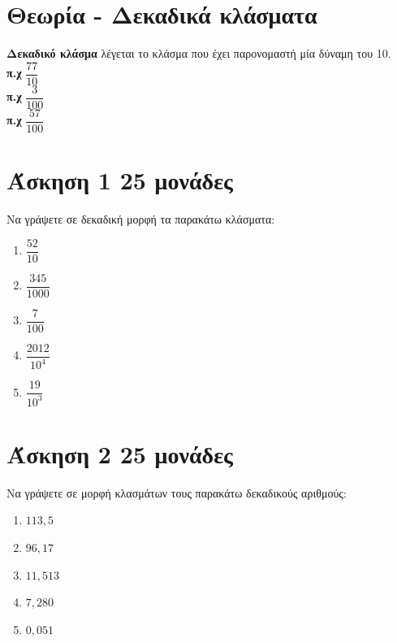 \documentclass[a4paper,10pt]{report}
\begin{document}
\section*{Θεωρία - Δεκαδικά κλάσματα \hfill \small{}}
\textbf{Δεκαδικό κλάσμα} λέγεται το κλάσμα που έχει παρονομαστή μία δύναμη του 10.  \\
\textbf{π.χ} $\dfrac{77}{10}$\\
\textbf{π.χ} $\dfrac{3}{100}$\\
\textbf{π.χ} $\dfrac{57}{100}$\\



\section*{Άσκηση 1  \hfill \small{25 μονάδες}}
Να γράψετε σε δεκαδική μορφή τα παρακάτω κλάσματα:
\begin{enumerate}[1)]
 \item $\dfrac{52}{10}$
 \item $\dfrac{345}{1000}$
 \item $\dfrac{7}{100}$
 \item $\dfrac{2012}{10^{4}}$
 \item $\dfrac{19}{10^{3}}$
\end{enumerate}

\section*{Άσκηση 2  \hfill \small{25 μονάδες}}
Να γράψετε σε μορφή κλασμάτων τους παρακάτω δεκαδικούς αριθμούς:
\begin{enumerate}[1)]
 \item $113,5$
 \item $96,17$
 \item $11,513$
 \item $7,280$
 \item $0,051$
\end{enumerate}
\end{document}

